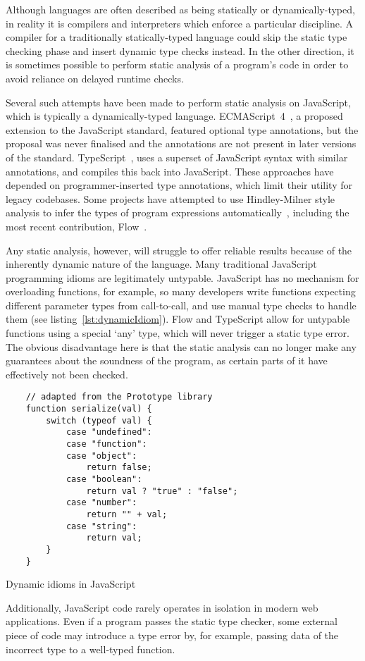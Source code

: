 \documentclass[12pt,a4paper,twoside,openright]{report}
\begin{document}
Although languages are often described as being statically or
dynamically-typed, in reality it is compilers and interpreters which enforce a
particular discipline. A compiler for a traditionally statically-typed language
could skip the static type checking phase and insert dynamic type checks
instead. In the other direction, it is sometimes possible to perform static
analysis of a program's code in order to avoid reliance on delayed runtime
checks.

Several such attempts have been made to perform static analysis on JavaScript,
which is typically a dynamically-typed language. ECMAScript~4~\cite{es4},
a proposed extension to the JavaScript standard, featured optional type
annotations, but the proposal was never finalised and the annotations are not
present in later versions of the standard. TypeScript~\cite{ts}, uses a
superset of JavaScript syntax with similar annotations, and compiles this back
into JavaScript. These approaches have depended on programmer-inserted type
annotations, which limit their utility for legacy codebases. Some projects
have attempted to use Hindley-Milner style analysis to infer the types of
program expressions automatically~\cite{anderson06, tajs, guha}, including the most
recent contribution, Flow~\cite{flow}. 

Any static analysis, however, will struggle to offer reliable results because
of the inherently dynamic nature of the language. Many traditional JavaScript
programming idioms are legitimately untypable. JavaScript has no
mechanism for overloading functions, for example, so many developers write
functions expecting different parameter types from call-to-call, and use manual
type checks to handle them (see listing~\ref{lst:dynamicIdiom}).  Flow and
TypeScript allow for untypable functions using a special `any' type, which will
never trigger a static type error. The obvious disadvantage here is that the
static analysis can no longer make any guarantees about the soundness of the
program, as certain parts of it have effectively not been checked.
\begin{program}[t]
  \begin{verbatim}
  	// adapted from the Prototype library
  	function serialize(val) {
	  	switch (typeof val) {
		  	case "undefined":
		  	case "function":
		  	case "object":
			  	return false;
		  	case "boolean":
			  	return val ? "true" : "false";
		  	case "number":
			  	return "" + val;
		  	case "string":
			  	return val;
	  	}
  	}	
  \end{verbatim}
  \label{lst:dynamicIdiom}
  \caption{Dynamic idioms in JavaScript}
\end{program}
Additionally, JavaScript code rarely operates in isolation in modern web
applications. Even if a program passes the static type checker, some external
piece of code may introduce a type error by, for example, passing data of the
incorrect type to a well-typed function.
\end{document}

